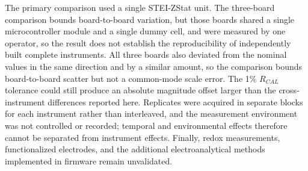 The primary comparison used a single STEI-ZStat unit. The three-board comparison bounds board-to-board variation, but those boards shared a single microcontroller module and a single dummy cell, and were measured by one operator, so the result does not establish the reproducibility of independently built complete instruments. All three boards also deviated from the nominal values in the same direction and by a similar amount, so the comparison bounds board-to-board scatter but not a common-mode scale error. The 1\% $R_{CAL}$ tolerance could still produce an absolute magnitude offset larger than the cross-instrument differences reported here. Replicates were acquired in separate blocks for each instrument rather than interleaved, and the measurement environment was not controlled or recorded; temporal and environmental effects therefore cannot be separated from instrument effects. Finally, redox measurements, functionalized electrodes, and the additional electroanalytical methods implemented in firmware remain unvalidated.